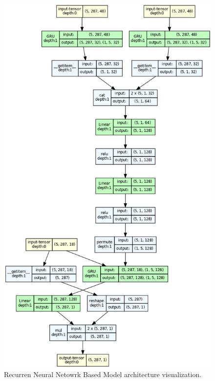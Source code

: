 \begin{figure}[H]
\begin{minipage}{0.4\textwidth}
		\includegraphics[width=\textwidth]{chapters/3_models/imgs/grrun/grrunarchitecture.png}
		\caption{Recurren Neural Netowrk Based Model architecture visualization.}\label{fig:grrunarchitecture}
	\end{minipage}
\end{figure}


